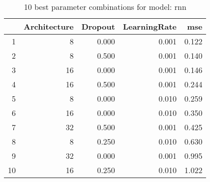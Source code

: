 \begin{table}[ht]
\centering
\begin{tabular}{rrrrr}
  \hline
 & Architecture & Dropout & LearningRate & mse \\ 
  \hline
1 &    8 & 0.000 & 0.001 & 0.122 \\ 
  2 &    8 & 0.500 & 0.001 & 0.140 \\ 
  3 &   16 & 0.000 & 0.001 & 0.146 \\ 
  4 &   16 & 0.500 & 0.001 & 0.244 \\ 
  5 &    8 & 0.000 & 0.010 & 0.259 \\ 
  6 &   16 & 0.000 & 0.010 & 0.350 \\ 
  7 &   32 & 0.500 & 0.001 & 0.425 \\ 
  8 &    8 & 0.250 & 0.010 & 0.630 \\ 
  9 &   32 & 0.000 & 0.001 & 0.995 \\ 
  10 &   16 & 0.250 & 0.010 & 1.022 \\ 
   \hline
\end{tabular}
\caption{10 best parameter combinations for model: rnn} 
\label{tab:rnn_top_10}
\end{table}
